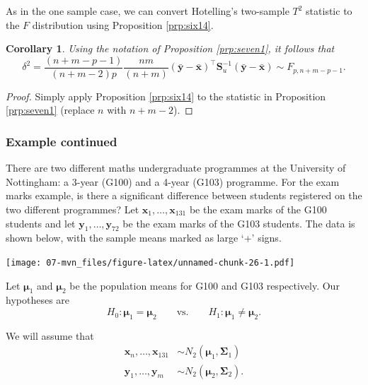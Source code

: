 \documentclass[
]{book}
\newtheorem{corollary}{Corollary}[chapter]
\theoremstyle{definition}
\theoremstyle{definition}
\theoremstyle{definition}
\theoremstyle{definition}
\theoremstyle{remark}
\begin{document}
As in the one sample case, we can convert Hotelling's two-sample \(T^2\) statistic to the \(F\) distribution using Proposition \ref{prp:six14}.

\begin{corollary}
\protect\hypertarget{cor:cseven1}{}\label{cor:cseven1}Using the notation of Proposition \ref{prp:seven1}, it follows that
\[\delta^2 = \frac{(n+m-p-1)}{(n+m-2)p} \frac{nm}{(n+m)} (\bar{\mathbf y} - \bar{\mathbf x})^\top \mathbf S_u^{-1} (\bar{\mathbf y} - \bar{\mathbf x}) \sim F_{p,n+m-p-1}.\]
\end{corollary}

\begin{proof}
Simply apply Proposition \ref{prp:six14} to the statistic in Proposition \ref{prp:seven1} (replace \(n\) with \(n+m-2\)).
\end{proof}

\hypertarget{example-continued-2}{%
\subsubsection*{Example continued}\label{example-continued-2}}

There are two different maths undergraduate programmes at the University of Nottingham: a 3-year (G100) and a 4-year (G103) programme. For the exam marks example, is there a significant difference between students registered on the two different programmes? Let \(\mathbf x_1,\ldots, \mathbf x_{131}\) be the exam marks of the G100 students and let \(\mathbf y_1,\ldots, \mathbf y_{72}\) be the exam marks of the G103 students. The data is shown below, with the sample means marked as large `+' signs.

\texttt{[image: 07-mvn\_files/figure-latex/unnamed-chunk-26-1.pdf]}

Let \({\boldsymbol{\mu}}_1\) and \({\boldsymbol{\mu}}_2\) be the population means for G100 and G103 respectively. Our hypotheses are
\[H_0: {\boldsymbol{\mu}}_1 = {\boldsymbol{\mu}}_2 \qquad \text{vs.} \qquad H_1: {\boldsymbol{\mu}}_1 \neq {\boldsymbol{\mu}}_2.\]

We will assume that
\begin{align*}
\mathbf x_n, \ldots, \mathbf x_{131}&\sim N_2({\boldsymbol{\mu}}_1,\boldsymbol{\Sigma}_1)\\
\mathbf y_1,\ldots,\mathbf y_m &\sim  N_2({\boldsymbol{\mu}}_2,\boldsymbol{\Sigma}_2).
\end{align*}
\end{document}
